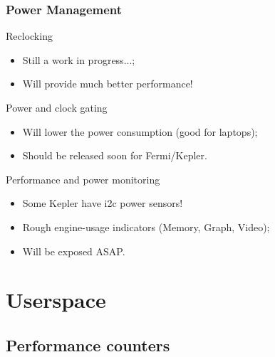 \documentclass[11pt,english,compress]{beamer}
\begin{document}
\begin{frame}
	\frametitle{Power Management}

	\begin{block}{Reclocking}
		\begin{itemize}
			\item Still a work in progress...;
			\item Will provide much better performance!
		\end{itemize}
	\end{block}

	\begin{block}{Power and clock gating}
		\begin{itemize}
			\item Will lower the power consumption (good for
laptops);
			\item Should be released soon for Fermi/Kepler.
		\end{itemize}
	\end{block}

	\begin{block}{Performance and power monitoring}
		\begin{itemize}
			\item Some Kepler have i2c power sensors!
			\item Rough engine-usage indicators (Memory, Graph,
Video);
			\item Will be exposed ASAP.
		\end{itemize}
	\end{block}
\end{frame}

\section{Userspace}

\subsection{Performance counters}
\end{document}

